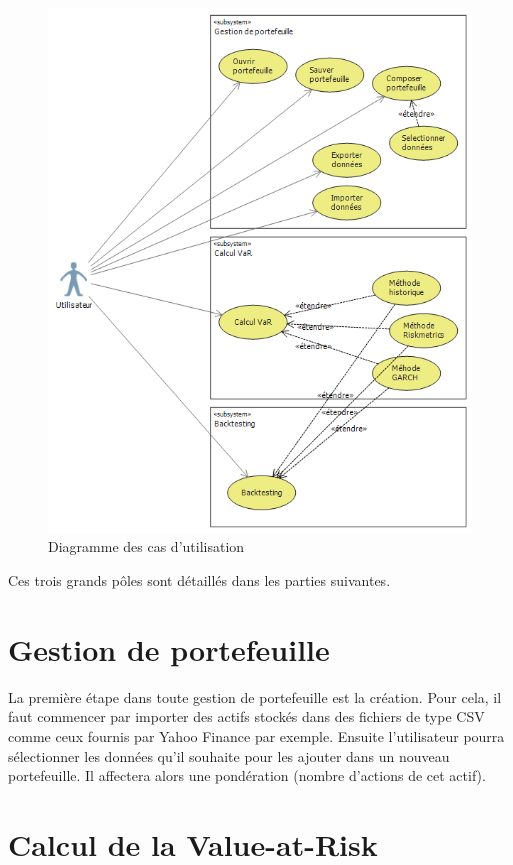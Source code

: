 \documentclass[a4paper,titlepage,french]{report}
\begin{document}
\begin{figure}[h]
 	\center
  	\includegraphics[scale=0.8]{UseCaseConception.png}
  	\caption{Diagramme des cas d'utilisation}
	\label{fig:usecase}
\end{figure}

Ces trois grands pôles sont détaillés dans les parties suivantes.


\section{Gestion de portefeuille}

La première étape dans toute gestion de portefeuille est la création.
Pour cela, il faut commencer par importer des actifs stockés dans des fichiers de type CSV comme ceux fournis par Yahoo Finance par exemple.
Ensuite l'utilisateur pourra sélectionner les données qu'il souhaite pour les ajouter dans un nouveau portefeuille. Il affectera alors une pondération (nombre d'actions de cet actif).


\section{Calcul de la Value-at-Risk}
\end{document}

